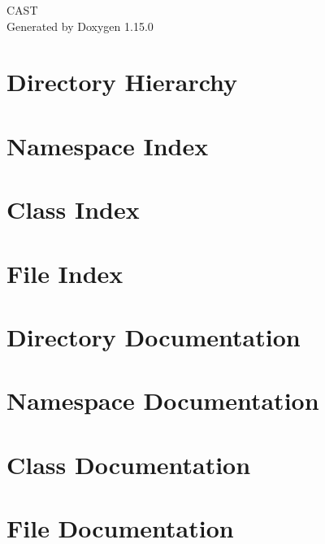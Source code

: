 \documentclass[twoside]{book}
\newcommand{\+}{\discretionary{\mbox{\scriptsize$\hookleftarrow$}}{}{}}
\newcommand{\clearemptydoublepage}{%
    \newpage{\pagestyle{empty}\cleardoublepage}%
  }
\begin{document}
  \raggedbottom
    \hypersetup{pageanchor=false,
                bookmarksnumbered=true,
                pdfencoding=unicode
               }
  \begin{titlepage}
  \vspace*{7cm}
  \begin{center}%
  {\Large CAST}\\
  \vspace*{1cm}
  {\large Generated by Doxygen 1.15.0}\\
  \end{center}
  \end{titlepage}
  \clearemptydoublepage
  \tableofcontents
  \clearemptydoublepage
  \hypersetup{pageanchor=true}
\chapter{Directory Hierarchy}

\chapter{Namespace Index}

\chapter{Class Index}

\chapter{File Index}

\chapter{Directory Documentation}





\chapter{Namespace Documentation}

\chapter{Class Documentation}

\chapter{File Documentation}




  \backmatter
  \newpage
  \clearemptydoublepage
  \printindex
\end{document}
